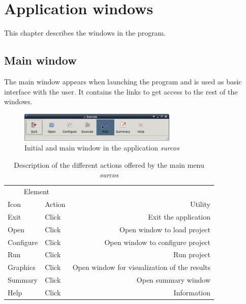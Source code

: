 \chapter{Application windows}

This chapter describes the windows in the program.

\section{Main window}

The main window appears when launching the program and is used as basic interface with the user. It contains the links to get access to the rest of the windows.
\\

\begin{figure}[!h]
\begin{center}
\includegraphics*[height=1.4cm]{images/mprincipalEN.png}
\caption{Initial and main window in the application \emph{surcos}}\label{mainWindow}
\end{center}
\end{figure}

\begin{table}[h]\footnotesize
\begin{center}
\begin{tabular}{llr}
\hline
\multicolumn{2}{c}{Element} \\
\cline{1-2}
Icon & Action & Utility \\
\hline
Exit & Click & Exit the application\\
Open & Click & Open window to load project \\
Configure & Click & Open window to configure project \\
Run & Click & Run project \\
Graphics & Click & Open window for visualization of the results  \\
Summary & Click & Open summary window \\
Help & Click & Information \\
\hline
\end{tabular}
\end{center}
  \caption{Description of the different actions offered by the main menu \emph{surcos}}\label{mainWindowIcons}
\end{table}

